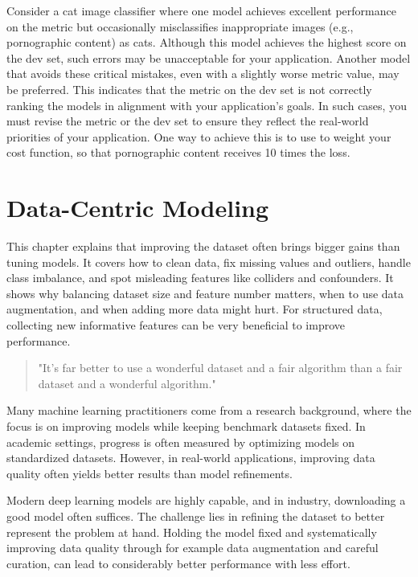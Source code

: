\documentclass[12pt,openany]{book}
\begin{document}
\begin{examplebox}
Consider a cat image classifier where one model achieves excellent performance on the metric but occasionally misclassifies inappropriate images (e.g., pornographic content) as cats. Although this model achieves the highest score on the dev set, such errors may be unacceptable for your application. Another model that avoids these critical mistakes, even with a slightly worse metric value, may be preferred. This indicates that the metric on the dev set is not correctly ranking the models in alignment with your application’s goals. In such cases, you must revise the metric or the dev set to ensure they reflect the real-world priorities of your application. One way to achieve this is to use to weight your cost function, so that pornographic content receives 10 times the loss. 
\end{examplebox}




\chapter{Data-Centric Modeling}

\begin{summarybox}
This chapter explains that improving the dataset often brings bigger gains than tuning models. It covers how to clean data, fix missing values and outliers, handle class imbalance, and spot misleading features like colliders and confounders. It shows why balancing dataset size and feature number matters, when to use data augmentation, and when adding more data might hurt. For structured data, collecting new informative features can be very beneficial to improve performance.
\end{summarybox}

\begin{quote}
    "It's far better to use a wonderful dataset and a fair algorithm than a fair dataset and a wonderful algorithm."
\end{quote}

Many machine learning practitioners come from a research background, where the focus is on improving models while keeping benchmark datasets fixed. In academic settings, progress is often measured by optimizing models on standardized datasets. However, in real-world applications, improving data quality often yields better results than model refinements.
\newline

Modern deep learning models are highly capable, and in industry, downloading a good model often suffices. The challenge lies in refining the dataset to better represent the problem at hand. Holding the model fixed and systematically improving data quality through for example data augmentation and careful curation, can lead to considerably better performance with less effort.
\newline
\end{document}

